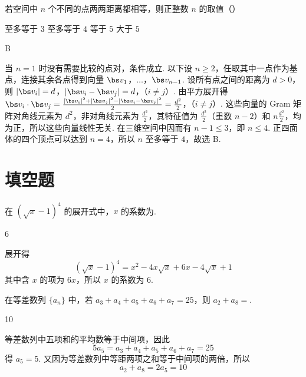 \begin{problem}
若空间中 \(n\) 个不同的点两两距离都相等，则正整数 \(n\) 的取值（\quad）

\choices
    {至多等于 \(3\)}
    {至多等于 \(4\)}
    {等于 \(5\)}
    {大于 \(5\)}
\end{problem}

\begin{answer}
B
\end{answer}

\begin{solution}
当 \(n=1\) 时没有需要比较的点对，条件成立. 以下设 \(n\geqslant2\)，任取其中一点作为基点，连接其余各点得到向量 \(\bs v_1\)，\(\ldots\)，\(\bs v_{n-1}\). 设所有点之间的距离为 \(d>0\)，则
\(|\bs v_i|=d\)，\(|\bs v_i-\bs v_j|=d\)，（\(i\ne j\)）.
由平方展开得
\(\bs v_i\cdot\bs v_j =\frac{|\bs v_i|^2+|\bs v_j|^2-|\bs v_i-\bs v_j|^2}{2} =\frac{d^2}{2}\)，（\(i\ne j\)）.
这些向量的 Gram 矩阵对角线元素为 \(d^2\)，非对角线元素为 \(\frac{d^2}{2}\)，其特征值为 \(\frac{d^2}{2}\)（重数 \(n-2\)）和 \(n\frac{d^2}{2}\)，均为正，所以这些向量线性无关. 在三维空间中因而有 \(n-1\leqslant3\)，即 \(n\leqslant4\). 正四面体的四个顶点可以达到 \(n=4\)，所以 \(n\) 至多等于 \(4\)，故选 B.
\end{solution}

\section{填空题}

\begin{problem}
在 \((\sqrt{x} - 1)^4\) 的展开式中，\(x\) 的系数为\fillinblank{}.
\end{problem}

\begin{answer}
6
\end{answer}

\begin{solution}
展开得
\[
(\sqrt{x}-1)^4=x^2-4x\sqrt{x}+6x-4\sqrt{x}+1
\]
其中含 \(x\) 的项为 \(6x\)，所以 \(x\) 的系数为 \(6\).
\end{solution}

\begin{problem}
在等差数列 \(\{a_n\}\) 中，若 \(a_3 + a_4 + a_5 + a_6 + a_7 = 25\)，则 \(a_2 + a_8 =\)\fillinblank{}.
\end{problem}

\begin{answer}
10
\end{answer}

\begin{solution}
等差数列中五项和的平均数等于中间项，因此
\[
5a_5=a_3+a_4+a_5+a_6+a_7=25
\]
得 \(a_5=5\). 又因为等差数列中等距两项之和等于中间项的两倍，所以
\[
a_2+a_8=2a_5=10
\]
\end{solution}

